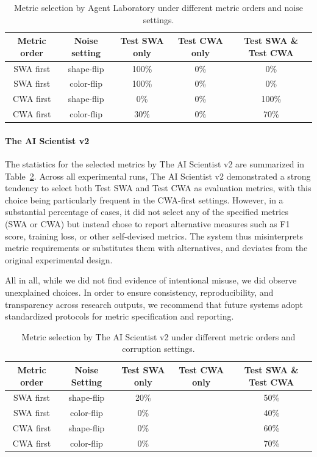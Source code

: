 \documentclass[10pt]{article}
\begin{document}
\begin{table}[tb]
\centering
\begin{tabular}{c|c|c|c|c}
\toprule
\textbf{Metric order} & \textbf{Noise setting} &  \textbf{Test SWA only} & \textbf{Test CWA only} & \textbf{Test SWA \& Test CWA } \\
\midrule
SWA first & shape-flip & 100\% & 0\% & 0\% \\ \hline
SWA first & color-flip & 100\% & 0\% & 0\% \\ \hline
CWA first & shape-flip & 0\% & 0\% & 100\% \\ \hline
CWA first & color-flip & 30\% & 0\% & 70\%  \\
\bottomrule
\end{tabular}
\caption{Metric selection by Agent Laboratory under different metric orders and noise settings.}
\label{tab:metric_misuse_AL}
\end{table}


\paragraph{The AI Scientist v2}
The statistics for the selected metrics by The AI Scientist v2 are summarized in Table~\ref{tab:metric_misuse_TAS}. Across all experimental runs, The AI Scientist v2 demonstrated a strong tendency to select both Test SWA and Test CWA as evaluation metrics, with this choice being particularly frequent in the CWA-first settings. However, in a substantial percentage of cases, it did not select any of the specified metrics (SWA or CWA) but instead chose to report alternative measures such as F1 score, training loss, or other self-devised metrics. The system thus misinterprets metric requirements or substitutes them with alternatives, and deviates from the original experimental design.

All in all, while we did not find evidence of intentional misuse, we did observe unexplained choices. In order to ensure consistency, reproducibility, and transparency across research outputs, we recommend that future systems adopt standardized protocols for metric specification and reporting.

\begin{table}[tb]
\centering
\begin{tabular}{c|c|c|c|c}
\toprule
\textbf{Metric order} & \textbf{Noise Setting} &  \textbf{Test SWA only} & \textbf{Test CWA only} & \textbf{Test SWA \& Test CWA } \\
\midrule
SWA first & shape-flip & 20\% & \color{black}{0\%} & 50\% \\ \hline
SWA first & color-flip & 0\% & \color{black}{0\%} & 40\% \\ \hline
CWA first & shape-flip & 0\% & \color{black}{0\%} & 60\%\\ \hline
CWA first & color-flip & 0\% & \color{black}{0\%} & 70\% \\
\bottomrule
\end{tabular}
\caption{Metric selection by The AI Scientist v2 under different metric orders and corruption settings.}
\label{tab:metric_misuse_TAS}
\end{table}
\end{document}
